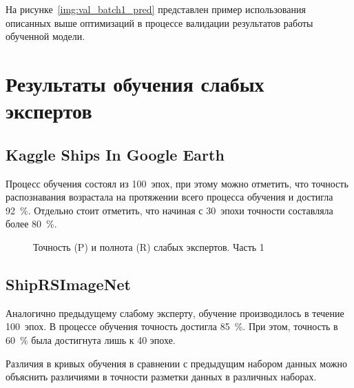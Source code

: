 На рисунке~\ref{img:val_batch1_pred} представлен пример использования описанных выше оптимизаций в процессе валидации результатов работы обученной модели.


\section{Результаты обучения слабых экспертов}

\subsection*{Kaggle Ships In Google Earth}

Процесс обучения состоял из 100~эпох, при этому можно отметить, что точность распознавания возрастала на протяжении всего процесса обучения и достигла 92~\%. Отдельно стоит отметить, что начиная с 30~эпохи точности составляла более 80~\%.


\begin{figure}[htp]
	\centering
	\captionsetup{justification=centering}
	\caption{Точность (P) и полнота (R) слабых экспертов. Часть 1}
	\label{plt:precision}
\end{figure}

\subsection*{ShipRSImageNet}

Аналогично предыдущему слабому эксперту, обучение производилось в течение 100~эпох. В процессе обучения точность достигла 85~\%. При этом, точность в 60~\% была достигнута лишь к 40 эпохе.

Различия в кривых обучения в сравнении с предыдущим набором данных можно объяснить различиями в точности разметки данных в различных наборах.

